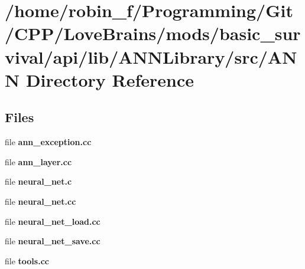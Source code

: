 \section{/home/robin\+\_\+f/\+Programming/\+Git/\+C\+P\+P/\+Love\+Brains/mods/basic\+\_\+survival/api/lib/\+A\+N\+N\+Library/src/\+A\+N\+N Directory Reference}
\label{dir_910b631408408454c409a66bca6cd126}
\subsection*{Files}
\begin{DoxyCompactItemize}
\item 
file {\bfseries ann\+\_\+exception.\+cc}
\item 
file {\bfseries ann\+\_\+layer.\+cc}
\item 
file {\bfseries neural\+\_\+net.\+c}
\item 
file {\bfseries neural\+\_\+net.\+cc}
\item 
file {\bfseries neural\+\_\+net\+\_\+load.\+cc}
\item 
file {\bfseries neural\+\_\+net\+\_\+save.\+cc}
\item 
file {\bfseries tools.\+cc}
\end{DoxyCompactItemize}
